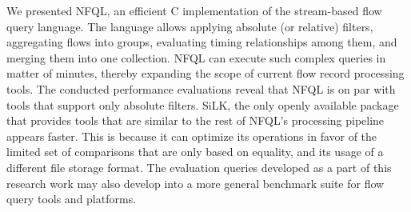 We presented \ac{NFQL}, an efficient C implementation of the stream-based flow
query language. The language allows applying absolute (or relative) filters,
aggregating flows into groups, evaluating timing relationships among them, and
merging them into one collection. \ac{NFQL} can execute such complex queries
in matter of minutes, thereby expanding the scope of current flow record
processing tools. The conducted performance evaluations reveal that \ac{NFQL}
is on par with tools that support only absolute filters. SiLK, the only openly
available package that provides tools that are similar to the rest of
\ac{NFQL}'s processing pipeline appears faster. This is because it can
optimize its operations in favor of the limited set of comparisons that are
only based on equality, and its usage of a different file storage format. The
evaluation queries developed as a part of this research work may also develop
into a more general benchmark suite for flow query tools and platforms.
